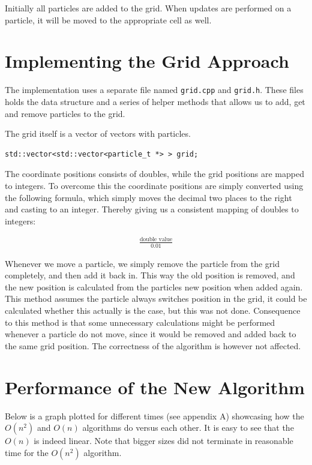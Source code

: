 \documentclass[a4paper,11pt,oneside]{book}
\begin{document}
Initially all particles are added to the grid. When updates are performed on a particle, it will be moved  to the
appropriate cell as well.

\section{Implementing the Grid Approach}


The implementation uses a separate file named \verb!grid.cpp! and \verb!grid.h!. These files holds the data structure
and a series of helper methods that allows us to add, get and remove particles to the grid.

The grid itself is 	a vector of vectors with particles.

\begin{verbatim}
std::vector<std::vector<particle_t *> > grid;
\end{verbatim}

The coordinate positions consists of doubles, while the grid positions are mapped to integers. To overcome this the
coordinate positions are simply converted using the following formula, which simply moves the decimal two places to the
right and casting to an integer. Thereby giving us a consistent mapping of doubles to integers:

\begin{align*}
\frac{\text{double value}}{0.01}
\end{align*}

Whenever we move a particle, we simply remove the particle from the grid completely, and then add it back in. This way
the old position is removed, and the new position is calculated from the particles new position when added again. \\
This method assumes the particle always switches position in the grid, it could be calculated whether this actually is
the case, but this was not done. Consequence to this method is that some unnecessary calculations might be performed
whenever a particle do not move, since it would be removed and added back to the same grid position. The correctness of
the algorithm is however not affected.

\section{Performance of the New Algorithm}

Below is a graph plotted for different times (see appendix A) showcasing how the $O(n^{2})$ and $O(n)$ algorithms do
versus each other. It is easy to see that the $O(n)$ is indeed linear. Note that bigger sizes did not terminate in
reasonable time for the $O(n^{2})$ algorithm.
\end{document}
